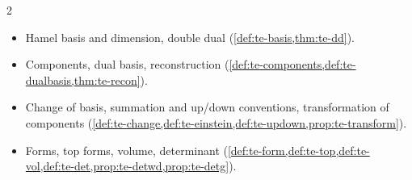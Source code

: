 \begin{paracol}{2}
\begin{keyconcepts}
\begin{itemize}
  \item Hamel basis and dimension, double dual (\cref{def:te-basis,thm:te-dd}).
  \item Components, dual basis, reconstruction (\cref{def:te-components,def:te-dualbasis,thm:te-recon}).
  \item Change of basis, summation and up/down conventions, transformation of components (\cref{def:te-change,def:te-einstein,def:te-updown,prop:te-transform}).
  \item Forms, top forms, volume, determinant (\cref{def:te-form,def:te-top,def:te-vol,def:te-det,prop:te-detwd,prop:te-detg}).
\end{itemize}
\end{keyconcepts}

\flushside
\end{paracol}
